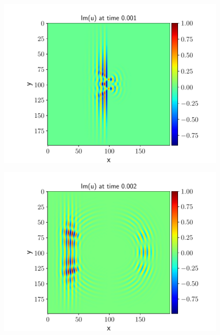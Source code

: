 \documentclass[english,notitlepage,reprint,nofootinbib]{revtex4-2}  %
\begin{document}
	\begin{figure}[h!]
		\centering
		\includegraphics[scale=0.55]{figures/im_plot_0.001.pdf}
		\caption{}
		\label{fig:prob8_Im1}
	\end{figure}
	
	\begin{figure}[h!]
		\centering
		\includegraphics[scale=0.55]{figures/im_plot_0.002.pdf}
		\caption{}
		\label{fig:prob8_Im2}
	\end{figure}
\end{document}
